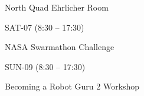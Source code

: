 \documentclass{article}
\begin{document}
\rssheader[2in]

\rssbig
\begin{center}
North Quad Ehrlicher Room
\end{center}

\vfill

\rssmed
\begin{center}
SAT-07 (8:30 -- 17:30)
\end{center}

\rsssm
\begin{center}
NASA Swarmathon Challenge
\end{center}

\vfill

\rssmed
\begin{center}
SUN-09 (8:30 -- 17:30)
\end{center}

\rsssm
\begin{center}
Becoming a Robot Guru 2 Workshop
\end{center}

\vfill
\end{document}
